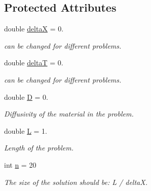 \subsection*{Protected Attributes}
\begin{DoxyCompactItemize}
\item 
\mbox{\label{class_solution_a8e97e5534ddcde31983432b8fb2050ff}} 
double \hyperlink{class_solution_a8e97e5534ddcde31983432b8fb2050ff}{deltaX} = 0.
\begin{DoxyCompactList}\small\item\em can be changed for different problems. \end{DoxyCompactList}\item 
\mbox{\label{class_solution_a116a08a1a8793618fb5269016cfd9b61}} 
double \hyperlink{class_solution_a116a08a1a8793618fb5269016cfd9b61}{deltaT} = 0.
\begin{DoxyCompactList}\small\item\em can be changed for different problems. \end{DoxyCompactList}\item 
\mbox{\label{class_solution_af647b9b893549259060034672babb0f8}} 
double \hyperlink{class_solution_af647b9b893549259060034672babb0f8}{D} = 0.
\begin{DoxyCompactList}\small\item\em Diffusivity of the material in the problem. \end{DoxyCompactList}\item 
\mbox{\label{class_solution_afa80e5854fb5af93932f445e426c7f66}} 
double \hyperlink{class_solution_afa80e5854fb5af93932f445e426c7f66}{L} = 1.
\begin{DoxyCompactList}\small\item\em Length of the problem. \end{DoxyCompactList}\item 
\mbox{\label{class_solution_aca95282163f453b465bb1991c596a34e}} 
int \hyperlink{class_solution_aca95282163f453b465bb1991c596a34e}{n} = 20
\begin{DoxyCompactList}\small\item\em The size of the solution should be\+: L / deltaX. \end{DoxyCompactList}\item 

\end{DoxyCompactItemize}
